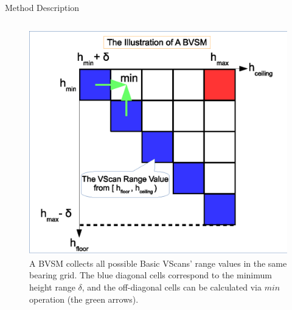 \documentclass[final,hyperref={pdfpagelabels=false}]{beamer}
\begin{document}
\begin{frame}[t]
\begin{columns}[t]
\begin{column}{0.47\textwidth}
\begin{block}{Method Description}
\begin{columns}
	\begin{column}{0.46\textwidth}
		\begin{figure}
			\centering
			\includegraphics[width=\textwidth]{BVSM}
			\caption{A BVSM collects all possible Basic VScans' range values in the same bearing grid. The blue diagonal cells correspond to the minimum height range $\delta$, and the off-diagonal cells can be calculated via $min$ operation (the green arrows).}
		\end{figure}
	\end{column}
\end{columns}


\end{block}
\end{column}
\end{columns}
\end{frame}
\end{document}
